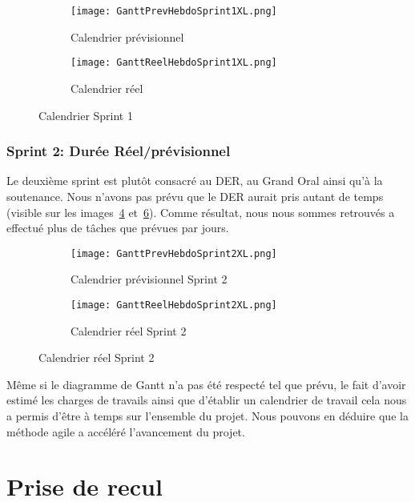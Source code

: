 \begin{figure}
   \centering
   \begin{subfigure}{.5\textwidth}
     \centering
     \texttt{[image: GanttPrevHebdoSprint1XL.png]}
   	\caption[]{Calendrier prévisionnel}
   	\label{fig:gantPrevHebdo1}
   \end{subfigure}%
   \begin{subfigure}{.5\textwidth}
     \centering
     \texttt{[image: GanttReelHebdoSprint1XL.png]}
   	\caption[]{Calendrier réel}
   	\label{fig:GantReelHebdo1}
   \end{subfigure}
   \caption{Calendrier Sprint 1}
\end{figure}


\subsubsection{Sprint 2: Durée Réel/prévisionnel}
Le deuxième sprint est plutôt consacré au DER, au Grand Oral ainsi qu'à la soutenance.
Nous n'avons pas prévu que le DER aurait pris autant de temps (visible sur les images~\ref{fig:gantPrevHebdo2} et~\ref{fig:GantReelHebdo2}).
Comme résultat, nous nous sommes retrouvés a effectué plus de tâches que prévues par jours. 

\begin{figure}
  \centering
  \begin{subfigure}{.5\textwidth}
    \centering
    \texttt{[image: GanttPrevHebdoSprint2XL.png]}
  	\caption[]{Calendrier prévisionnel Sprint 2}
  	\label{fig:gantPrevHebdo2}
  \end{subfigure}%
  \begin{subfigure}{.5\textwidth}
    \centering
    \texttt{[image: GanttReelHebdoSprint2XL.png]}
  	\caption[]{Calendrier réel Sprint 2}
  	\label{fig:GantReelHebdo2}
  \end{subfigure}
\end{figure}

Même si le diagramme de Gantt n'a pas été respecté tel que prévu, le fait d’avoir estimé les charges de travails ainsi que d'établir un calendrier de travail cela nous a permis d'être à temps sur l'ensemble du projet.
Nous pouvons en déduire que la méthode agile a accéléré l'avancement du projet.


\section{Prise de recul}

